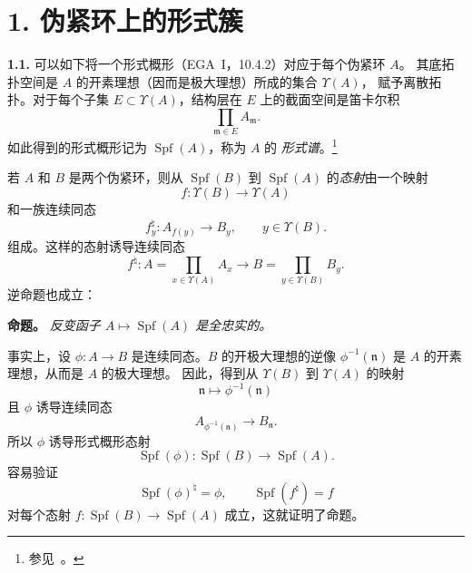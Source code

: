 
\section*{1. 伪紧环上的形式簇}
\label{sga3:VIIB:1}

\medskip
\noindent\textbf{1.1.}
\label{sga3:VIIB:1.1}
可以如下将一个形式概形（EGA~I，10.4.2）对应于每个伪紧环 \(A\)。
其底拓扑空间是 \(A\) 的开素理想（因而是极大理想）所成的集合 \(\Upsilon(A)\)，
赋予离散拓扑。对于每个子集 \(E\subset\Upsilon(A)\)，结构层在 \(E\) 上的截面空间是笛卡尔积
\[
  \prod_{\mathfrak m\in E}A_{\mathfrak m}.
\]
如此得到的形式概形记为 \(\operatorname{Spf}(A)\)，称为 \(A\) 的
\emph{形式谱}。\footnote{\label{sga3:VIIB:nde:37}%
参见\ 。}

若 \(A\) 和 \(B\) 是两个伪紧环，则从 \(\operatorname{Spf}(B)\) 到
\(\operatorname{Spf}(A)\) 的\emph{态射}由一个映射
\[
  f:\Upsilon(B)\longrightarrow\Upsilon(A)
\]
和一族连续同态
\[
  f_y^\natural:A_{f(y)}\longrightarrow B_y,
  \qquad y\in\Upsilon(B).
\]
组成。这样的态射诱导连续同态
\[
  f^\natural:
  A=\prod_{x\in\Upsilon(A)}A_x
  \longrightarrow
  B=\prod_{y\in\Upsilon(B)}B_y.
\]
逆命题也成立：

\medskip
\noindent\textbf{命题。}
\label{sga3:VIIB:1.1-spf-fully-faithful}
\textit{反变函子 \(A\mapsto\operatorname{Spf}(A)\) 是全忠实的。}

事实上，设 \(\phi:A\to B\) 是连续同态。\(B\) 的开极大理想的逆像
\(\phi^{-1}(\mathfrak n)\) 是 \(A\) 的开素理想，从而是 \(A\) 的极大理想。
因此，得到从 \(\Upsilon(B)\) 到 \(\Upsilon(A)\) 的映射
\[
  \mathfrak n\longmapsto\phi^{-1}(\mathfrak n)
\]
且 \(\phi\) 诱导连续同态
\[
  A_{\phi^{-1}(\mathfrak n)}\longrightarrow B_{\mathfrak n}.
\]
所以 \(\phi\) 诱导形式概形态射
\[
  \operatorname{Spf}(\phi):
  \operatorname{Spf}(B)\longrightarrow\operatorname{Spf}(A).
\]
容易验证
\[
  \operatorname{Spf}(\phi)^\natural=\phi,
  \qquad
  \operatorname{Spf}(f^\natural)=f
\]
对每个态射 \(f:\operatorname{Spf}(B)\to\operatorname{Spf}(A)\) 成立，这就证明了命题。

